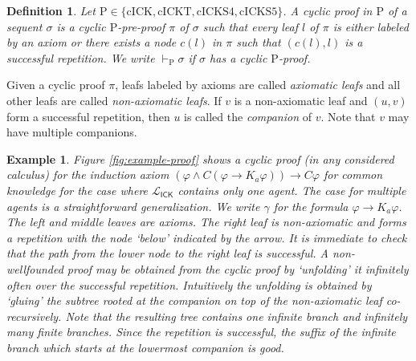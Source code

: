 \documentclass{myifcolog}
\newcommand\C {C}
\newcommand{\K}{K}
\newcommand{\agi}{a}
\newcommand{\ICK}{\mathsf{ICK}}
\newcommand{\LICK}{\mathcal{L}_{\ICK}}
\newcommand{\hickp}{\mathrm{P}}
\newcommand{\cick}{\mathrm{cICK}}
\newcommand{\cickt}{\mathrm{cICKT}}
\newcommand{\cicks}{\mathrm{cICKS4}}
\newcommand{\cickss}{\mathrm{cICKS5}}
\newtheorem{definition}[theorem]{Definition}
\newtheorem{example}[theorem]{Example}
\numberwithin{theorem}{section}
\begin{document}
\begin{definition}
   Let $\hickp \in \{\cick, \cickt, \cicks, \cickss\}$. A \emph{cyclic proof} in $\hickp$ of a sequent $\sigma$ is a cyclic $\hickp$-pre-proof $\pi$ of $\sigma$ such that every leaf $l$ of $\pi$ is either labeled by an axiom or there exists a node $c(l)$ in $\pi$ such that $(c(l),l)$ is a successful repetition. We write $\vdash_\hickp \sigma$ if $\sigma$ has a cyclic $\hickp$-proof.
\end{definition}

Given a cyclic proof $\pi$, leafs labeled by axioms are called \emph{axiomatic leafs} and all other leafs are called \emph{non-axiomatic leafs}. If $v$ is a non-axiomatic leaf and $(u,v)$ form a successful repetition, then $u$ is called the \emph{companion} of $v$. Note that $v$ may have multiple companions.




\begin{example}\label{e: non-wellfounded and cyclic proof for IM}
    Figure \ref{fig:example-proof} shows a cyclic proof (in any considered calculus) for the induction axiom $(\varphi \wedge \C(\varphi \rightarrow \K_\agi \varphi)) \rightarrow \C \varphi$ for common knowledge for the case where $\LICK$ contains only one agent. The case for multiple agents is a straightforward generalization. We write $\gamma$ for the formula $\varphi \rightarrow \K_\agi \varphi$. The left and middle leaves are axioms. The right leaf is non-axiomatic and forms a repetition with the node `below' indicated by the arrow. It is immediate to check that the path from the lower node to the right leaf is successful. A non-wellfounded proof may be obtained from the cyclic proof by `unfolding' it infinitely often over the successful repetition. Intuitively the unfolding is obtained by `gluing' the subtree rooted at the companion on top of the non-axiomatic leaf co-recursively. Note that the resulting tree contains one infinite branch and infinitely many finite branches. Since the repetition is successful, the suffix of the infinite branch which starts at the lowermost companion is good. 
\end{example}
\end{document}
